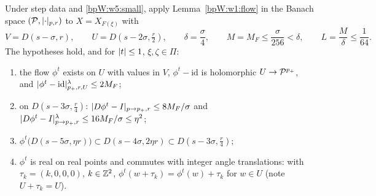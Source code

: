 \begin{lemma}\label{bpW:w5:flow}
Under step data and \eqref{bpW:w5:small}, apply Lemma~\ref{bpW:w1:flow} in the Banach space $(\mathcal P,\lvert \cdot\rvert_{p,r})$
to $X=X_{F(\xi)}$ with
\[V=D(s-\sigma,r),\qquad U=D(s-2\sigma,\tfrac r2),\qquad\delta=\frac\sigma4,\qquad M=M_F\le\frac{\sigma}{256}<\delta,\qquad
L=\frac{M}{\delta}\le\frac1{64}.\]
The hypotheses hold, and for $\lvert t\rvert\le1$, $\xi,\zeta\in\Pi$:
\begin{enumerate}[label=(\roman*)]
\item the flow $\phi^t$ exists on $U$ with values in $V$, $\phi^t-\mathrm{id}$ is holomorphic $U\to\mathcal P^{p_+}$, and
  $\lvert \phi^t-\mathrm{id}\rvert^\lambda_{p_+,r,U}\le2M_F$;
\item on $D(s-3\sigma,\frac r4)$: $\lvert D\phi^t-I\rvert_{p\to p_+,r}\le8M_F/\sigma$ and
  $\lvert D\phi^t-I\rvert^\lambda_{p\to p_+,r}\le16M_F/\sigma\le\eta^2$;
\item $\phi^t\bigl(D(s-5\sigma,\eta r)\bigr)\subset D(s-4\sigma,2\eta r)\subset D(s-3\sigma,\frac r4)$;
\item $\phi^t$ is real on real points and commutes with integer angle translations: with $\tau_k=(k,0,0,0)$,
  $k\in\mathbb{Z}^2$, $\phi^t(w+\tau_k)=\phi^t(w)+\tau_k$ for $w\in U$ (note $U+\tau_k=U$).
\end{enumerate}
\end{lemma}
